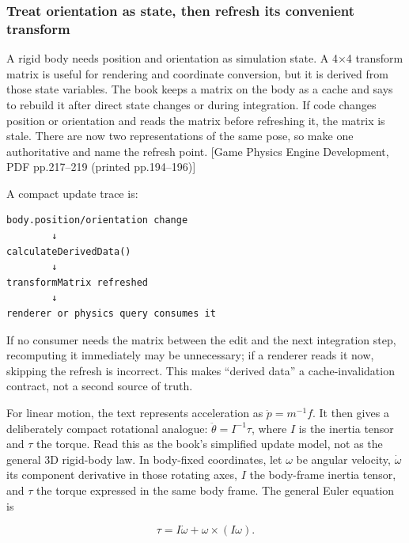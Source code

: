 \subsubsection{Treat orientation as state, then refresh its convenient transform}\label{06-engine-ii-ch033-treat-orientation-as-state-then-refresh-its-convenient-transform}

\hypertarget{06-engine-ii-ch033-treat-orientation-as-state-then-refresh-its-convenient-transform}{}

A rigid body needs position and orientation as simulation state. A 4×4 transform matrix is useful for rendering and coordinate conversion, but it is derived from those state variables. The book keeps a matrix on the body as a cache and says to rebuild it after direct state changes or during integration. If code changes position or orientation and reads the matrix before refreshing it, the matrix is stale. There are now two representations of the same pose, so make one authoritative and name the refresh point. {[}Game Physics Engine Development, PDF pp.217--219 (printed pp.194--196){]}

A compact update trace is:

\begin{verbatim}
body.position/orientation change
        ↓
calculateDerivedData()
        ↓
transformMatrix refreshed
        ↓
renderer or physics query consumes it
\end{verbatim}

If no consumer needs the matrix between the edit and the next integration step, recomputing it immediately may be unnecessary; if a renderer reads it now, skipping the refresh is incorrect. This makes ``derived data'' a cache-invalidation contract, not a second source of truth.

For linear motion, the text represents acceleration as \(\ddot{p}=m^{-1}f\). It then gives a deliberately compact rotational analogue: \(\ddot{\theta}=I^{-1}\tau\), where \(I\) is the inertia tensor and \(\tau\) the torque. Read this as the book's simplified update model, not as the general 3D rigid-body law. In body-fixed coordinates, let \(\omega\) be angular velocity, \(\dot{\omega}\) its component derivative in those rotating axes, \(I\) the body-frame inertia tensor, and \(\tau\) the torque expressed in the same body frame. The general Euler equation is

\[
\tau=I\dot{\omega}+\omega\times(I\omega).
\]

